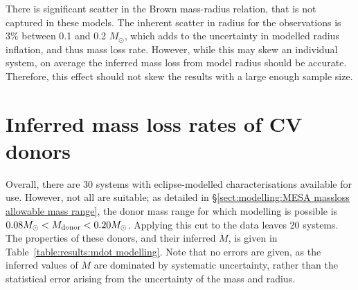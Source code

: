 There is significant scatter in the Brown mass-radius relation, that is not captured in these models. The inherent scatter in radius for the observations is $3\%$ between 0.1 and 0.2 $M_\odot$, which adds to the uncertainty in modelled radius inflation, and thus mass loss rate.
However, while this may skew an individual system, on average the inferred mass loss from model radius should be accurate. Therefore, this effect should not skew the results with a large enough sample size.


\section{Inferred mass loss rates of CV donors}
Overall, there are 30 systems with eclipse-modelled characterisations available for use.
However, not all are suitable; as detailed in \S\ref{sect:modelling:MESA massloss allowable mass range}, the donor mass range for which modelling is possible is $0.08 M_\odot < M_{\rm donor} < 0.20 M_\odot$.
Applying this cut to the data leaves 20 systems.
The properties of these donors, and their inferred $\dot M$, is given in Table~\ref{table:results:mdot modelling}. Note that no errors are given, as the inferred values of $\dot M$ are dominated by systematic uncertainty, rather than the statistical error arising from the uncertainty of the mass and radius.

